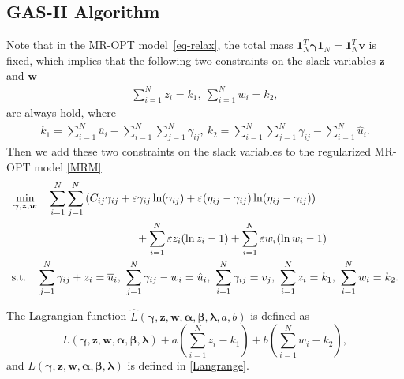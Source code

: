 \documentclass[review,hidelinks,onefignum,onetabnum]{siamart220329}
\begin{document}
\subsection{GAS-II Algorithm}\label{subsec:GAS-II}
Note that in the MR-OPT model~\cref{eq-relax}, the total mass $\bm{1}_N^T\bm{\gamma}\bm{1}_N=\bm{1}_N^T\bm{v}$ is fixed, which implies that the following two constraints on the slack variables $\bm{z}$ and $\bm{w}$
\begin{align*}
    \sum_{i=1}^N z_{i} = k_1,\  \sum_{i=1}^N w_{i} = k_2,
\end{align*}
are always hold, where
\begin{align*}
    k_1=\sum_{i=1}^N \overline{u}_i - \sum_{i=1}^{N}\sum_{j=1}^{N} \gamma_{ij},\ k_2= \sum_{i=1}^{N}\sum_{j=1}^{N} \gamma_{ij}-\sum_{i=1}^N \hat{u}_i.
\end{align*}
Then we add these two constraints on the slack variables to the regularized MR-OPT model \cref{MRM}
\begin{equation}\label{con_MRM}
\begin{aligned}
& \mathtoolsset{multlined-width=0.8\displaywidth}
\begin{multlined}
    \min_{\bm{\gamma}, \bm{z}, \bm{w}} \quad \sum_{i=1}^{N}\sum_{j=1}^{N} \left(C_{ij}\gamma_{ij}+\varepsilon \gamma_{ij} \ln(\gamma_{ij})+\varepsilon (\eta_{ij}-\gamma_{ij}) \ln(\eta_{ij}-\gamma_{ij})\right) \\
    +\sum_{i=1}^{N} \varepsilon z_i (\ln z_i-1)+\sum_{i=1}^{N} \varepsilon w_i (\ln w_i-1)
\end{multlined}
\\
& \text{s.t.} \quad \sum_{j=1}^{N} \gamma_{ij} + z_i = \overline{u}_i, \ \sum_{j=1}^{N} \gamma_{ij} - w_i = \hat{u}_i, \ \sum_{i=1}^N \gamma_{ij} = v_j, \ \sum_{i=1}^N z_{i} = k_1,\  \sum_{i=1}^N w_{i} = k_2.
\end{aligned}
\end{equation}

The Lagrangian function $\hat{L}(\bm{\gamma},\bm{z},\bm{w},\bm{\alpha},\bm{\beta},\bm{\lambda},a, b)$ is defined as 
\begin{equation}\label{con_Langrange}
    L(\bm{\gamma},\bm{z},\bm{w},\bm{\alpha},\bm{\beta},\bm{\lambda})
    +a\left(\sum_{i=1}^{N} z_i-k_1\right)+b\left(\sum_{i=1}^{N} w_i-k_2\right), 
\end{equation}
and $L(\bm{\gamma},\bm{z},\bm{w},\bm{\alpha},\bm{\beta},\bm{\lambda})$ is defined in \cref{Langrange}. 
\end{document}
